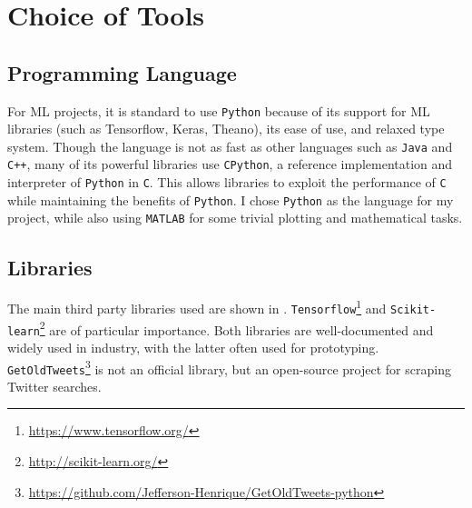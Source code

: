 \documentclass[12pt,a4paper,twoside,openright]{report}
\begin{document}
\section{Choice of Tools}
\label{sec:introTool}

\subsection{Programming Language}

For ML projects, it is standard to use \texttt{Python}
because of its support for ML libraries (such as Tensorflow, Keras, Theano), its
ease of use, and relaxed type system. Though the language is not as
fast as other languages such as \texttt{Java} and \texttt{C++}, many of its
powerful libraries use \texttt{CPython}, a reference implementation
and interpreter of \texttt{Python} in \texttt{C}.
This allows libraries to exploit the performance of \texttt{C} while maintaining
the benefits of \texttt{Python}. I chose \texttt{Python} as the
language for my project, while also using \texttt{MATLAB} for some trivial
plotting and mathematical tasks.

\subsection{Libraries}
\label{sec:introLib}

The main third party libraries used are shown in . \texttt{Tensorflow}\footnote{\url{https://www.tensorflow.org/}}
and \texttt{Scikit-learn}\footnote{\url{http://scikit-learn.org/}} are
of particular importance. Both libraries are well-documented and widely used in industry, with the 
latter often used for prototyping. \texttt{GetOldTweets}\footnote{\url{https://github.com/Jefferson-Henrique/GetOldTweets-python}}
is not an official library, but an open-source
project for scraping Twitter searches.
\end{document}
